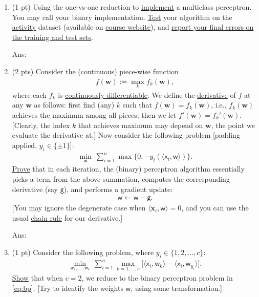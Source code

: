 \documentclass[10pt]{article}
\newcommand{\wv}{\mathbf{w}}
\newcommand{\xv}{\mathbf{x}}
\newcommand{\inner}[2]{\langle #1, #2 \rangle}
\newcommand{\red}[1]{{\color{red}#1}}
\newcommand{\xbs}{\bm{\mathsf{x}}}
\newcommand{\wbs}{\bm{\mathsf{w}}}
\newcommand{\gbs}{\bm{\mathsf{g}}}
\newcommand{\ie}{{i.e.}\xspace}
\newcommand{\ans}[1]{{\color{orange}\textsf{Ans}: #1}}
\begin{document}
\begin{exercise}
\begin{enumerate}
	\ans{ 
	\vskip2cm
	}
		
	\item (1 pt) Using the one-vs-one reduction to \uline{implement} a multiclass perceptron. You may call your binary implementation. \uline{Test} your algorithm on the \href{https://archive.ics.uci.edu/ml/datasets/human+activity+recognition+using+smartphones}{activity} dataset (available on \href{https://cs.uwaterloo.ca/~y328yu/mycourses/480/assignment.html}{course website}), and \uline{report your final errors on the training and test sets}. 
	
	\ans{\vskip1cm
	}	
		
	\item (2 pts) Consider the (continuous) piece-wise function 
	\begin{align}
	f(\wv) := \max_k f_k(\wv),
	\end{align}
	where each $f_k$ is \href{https://en.wikipedia.org/wiki/Differentiable_function}{continuously differentiable}. 
	We define the \href{https://en.wikipedia.org/wiki/Subderivative}{derivative} of $f$ at any $\wv$ as follows: first find (any) $k$ such that $f(\wv) = f_k(\wv)$, \ie, $f_k(\wv)$ achieves the maximum among all pieces; then we let $f'(\wv) = f_k'(\wv)$. [Clearly, the index $k$ that achieves maximum may depend on $\wv$, the point we evaluate the derivative at.] Now consider the following problem [padding applied, $y_i \in \{\pm1\}$]: 
	\begin{align}
	\label{eq:bp}
	\min_{\wbs} ~ \sum_{i=1}^n \max\{ 0, -y_i (\inner{\xbs_i}{\wbs}) \}.
	\end{align}
	\uline{Prove} that in each iteration, the (binary) perceptron algorithm essentially picks a term from the above summation, computes the corresponding derivative (say $\gbs$), and performs a gradient update: 
	\begin{align}
	\wbs \gets \wbs - \gbs.
	\end{align}
	[You may ignore the degenerate case when $\inner{\xv_i}{\wbs} = 0$, and you can use  the usual \href{https://en.wikipedia.org/wiki/Chain_rule}{chain rule} for our derivative.]
	
	\ans{ 
	\vskip6cm
	}	

	\item (1 pt) Consider the following problem, where \red{$y_i \in \{1, 2, \ldots, c\}$}:
	\begin{align}
		\label{eq:mp}
		\min_{\wbs_1, \ldots, \wbs_c} ~ \sum_{i=1}^n \max_{k=1,\ldots, c} \Big [\inner{\xbs_i}{\wbs_k} - \inner{\xbs_i}{\wbs_{y_i}} \Big].
	\end{align}
	\uline{Show} that when $c=2$, we reduce to the binary perceptron problem in \eqref{eq:bp}. [Try to identify the weights $\wbs$, using some transformation.]
	

\end{enumerate}
\end{exercise}
\end{document}
